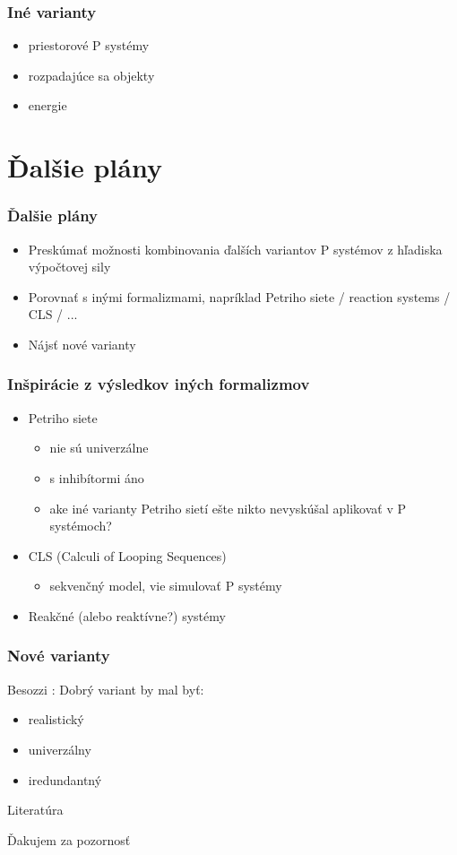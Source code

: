 \documentclass{beamer}
\begin{document}
\begin{frame}[t]\frametitle{Iné varianty}
\begin{itemize}
  \item priestorové P systémy
  \item rozpadajúce sa objekty
  \item energie
\end{itemize}
\end{frame}


\section{Ďalšie plány} %
\label{sec:dalsie_plany}

\begin{frame}[t]\frametitle{Ďalšie plány}
\begin{itemize}
  \item Preskúmať možnosti kombinovania ďalších variantov P systémov z hľadiska výpočtovej sily
  \item Porovnať s inými formalizmami, napríklad Petriho siete / reaction systems / CLS / ...
  \item Nájsť nové varianty
\end{itemize}
\end{frame}


\begin{frame}[t]\frametitle{Inšpirácie z výsledkov iných formalizmov}
\begin{itemize}
  \item Petriho siete
  \begin{itemize}
    \item nie sú univerzálne
    \item s inhibítormi áno
    \item ake iné varianty Petriho sietí ešte nikto nevyskúšal aplikovať v P systémoch?
  \end{itemize}
  \item CLS (Calculi of Looping Sequences)
  \begin{itemize}
    \item sekvenčný model, vie simulovať P systémy \cite{Barbuti07CLS}
  \end{itemize}
  \item Reakčné (alebo reaktívne?) systémy
\end{itemize}
\end{frame}

\begin{frame}[t]\frametitle{Nové varianty}
Besozzi \cite{Besozzi:PhD:2004}: Dobrý variant by mal byť:
\begin{itemize}
  \item realistický
  \item univerzálny
  \item iredundantný
\end{itemize}
\end{frame}


\begin{frame}[allowframebreaks]{Literatúra}


\end{frame}

\begin{frame}[plain]
\begin{center}
  Ďakujem za pozornosť
\end{center}
\end{frame}
\end{document}
